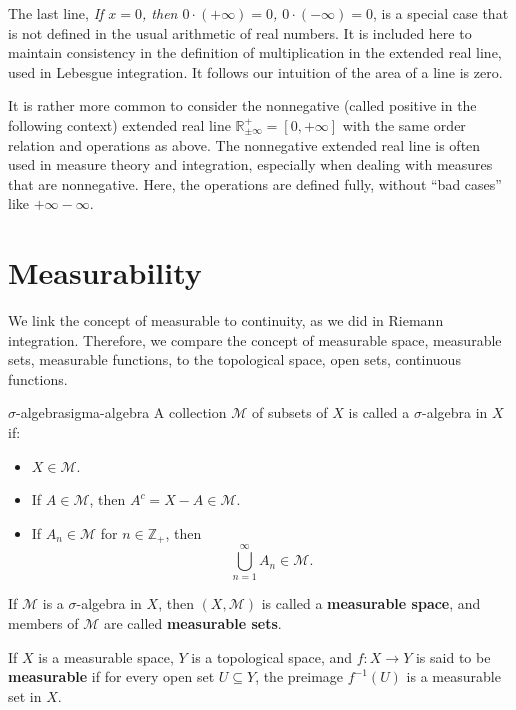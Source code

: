 \documentclass[../main.tex]{subfiles}
\begin{document}
\begin{remark}
	The last line, \textit{If $x=0$, then $0\cdot (+\infty ) = 0$, $0\cdot (-\infty ) = 0$}, is a special case that is not defined in the usual arithmetic of real numbers. It is included here to maintain consistency in the definition of multiplication in the extended real line, used in Lebesgue integration. It follows our intuition of the area of a line is zero.
\end{remark}

It is rather more common to consider the nonnegative (called positive in the following context) extended real line $\mathbb{R}_{\pm \infty }^+ = [0,+\infty ]$ with the same order relation and operations as above. The nonnegative extended real line is often used in measure theory and integration, especially when dealing with measures that are nonnegative. Here, the operations are defined fully, without ``bad cases'' like $+\infty -\infty $.

\section{Measurability}

We link the concept of measurable to continuity, as we did in Riemann integration. Therefore, we compare the concept of measurable space, measurable sets, measurable functions, to the topological space, open sets, continuous functions.

\begin{definition}{$\sigma$-algebra}{sigma-algebra}
A collection $\mathcal{M}$ of subsets of $X$ is called a $\sigma$-algebra in $X$ if:
\begin{itemize}
\item $X\in \mathcal{M}$.
\item If $A\in \mathcal{M}$, then $A^c=X-A\in \mathcal{M}$.
\item If $A_n\in \mathcal{M}$ for $n\in \mathbb{Z}_+$, then
	\begin{equation*}
		\bigcup_{n=1}^{\infty} A_n \in \mathcal{M}.
	\end{equation*}
\end{itemize}

If $\mathcal{M}$ is a $\sigma$-algebra in $X$, then $(X, \mathcal{M})$ is called a \textbf{measurable space}, and members of $\mathcal{M}$ are called \textbf{measurable sets}.

If $X$ is a measurable space, $Y$ is a topological space, and $f: X \rightarrow Y$ is said to be \textbf{measurable} if for every open set $U\subseteq Y$, the preimage $f^{-1}(U)$ is a measurable set in $X$.
\end{definition}
\end{document}
